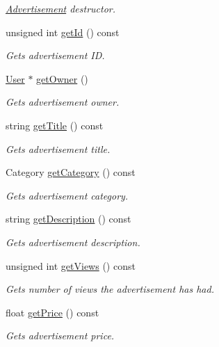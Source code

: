 \begin{DoxyCompactItemize}
\begin{DoxyCompactList}\small\item\em \hyperlink{class_advertisement}{Advertisement} destructor. \end{DoxyCompactList}\item 
unsigned int \hyperlink{class_advertisement_aa66d9158d12ae99a04f81cf2adb155fd}{get\+Id} () const 
\begin{DoxyCompactList}\small\item\em Gets advertisement I\+D. \end{DoxyCompactList}\item 
\hyperlink{class_user}{User} $\ast$ \hyperlink{class_advertisement_a35f461deb86dce9b3b09cadf64b1cdf3}{get\+Owner} ()
\begin{DoxyCompactList}\small\item\em Gets advertisement owner. \end{DoxyCompactList}\item 
string \hyperlink{class_advertisement_ac65aa68caf2b1697c0cc04f2ebb0fd99}{get\+Title} () const 
\begin{DoxyCompactList}\small\item\em Gets advertisement title. \end{DoxyCompactList}\item 
Category \hyperlink{class_advertisement_a123c05d427fed1ac7fec0f55050da20d}{get\+Category} () const 
\begin{DoxyCompactList}\small\item\em Gets advertisement category. \end{DoxyCompactList}\item 
string \hyperlink{class_advertisement_ac455b4918dbd923af81efbaebf924985}{get\+Description} () const 
\begin{DoxyCompactList}\small\item\em Gets advertisement description. \end{DoxyCompactList}\item 
unsigned int \hyperlink{class_advertisement_a823c798799bcdf75a5b65158d6ad8c96}{get\+Views} () const 
\begin{DoxyCompactList}\small\item\em Gets number of views the advertisement has had. \end{DoxyCompactList}\item 
float \hyperlink{class_advertisement_a6c7a08129880f12744853f9ceeb172ee}{get\+Price} () const 
\begin{DoxyCompactList}\small\item\em Gets advertisement price. \end{DoxyCompactList}\item 

\end{DoxyCompactItemize}
